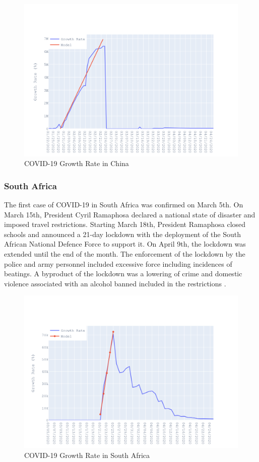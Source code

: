 \documentclass{homework}
\begin{document}
\begin{figure}[H]
  \centering
  \includegraphics[scale=0.3]{task3/China.png}
  \caption{COVID-19 Growth Rate in China}
\end{figure}

\newpage
\subsubsection{South Africa}

The first case of COVID-19 in South Africa was confirmed on March 5th. On March 15th, President Cyril Ramaphosa declared a national state of disaster and imposed travel restrictions. Starting March 18th, President Ramaphosa closed schools and announced a 21-day lockdown with the deployment of the South African National Defence Force to support it. On April 9th, the lockdown was extended until the end of the month. The enforcement of the lockdown by the police and army personnel included excessive force including incidences of beatings. A byproduct of the lockdown was a lowering of crime and domestic violence associated with an alcohol banned included in the restrictions \cite{knoetze_2020}.

\begin{figure}[H]
  \centering
  \includegraphics[scale=0.3]{task3/SouthAfrica.png}
  \caption{COVID-19 Growth Rate in South Africa}
\end{figure}
\end{document}

